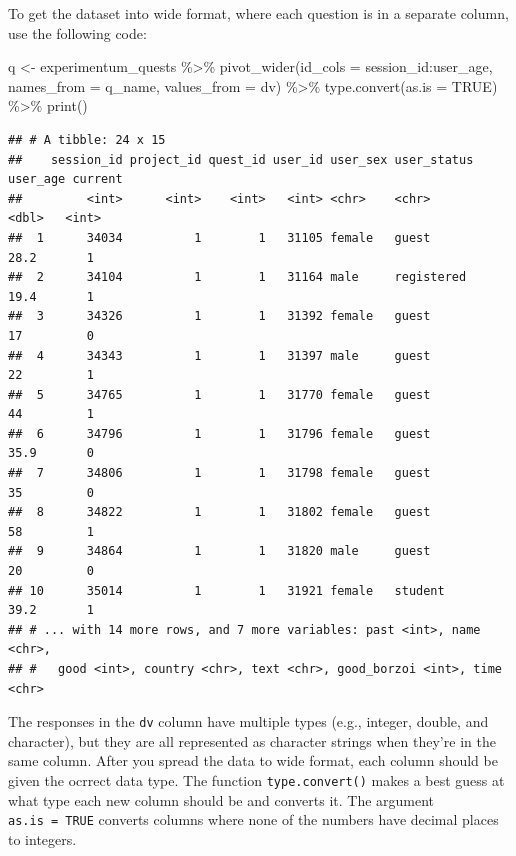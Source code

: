 \documentclass[
  oneside]{book}
\newenvironment{Shaded}{\begin{snugshade}}{\end{snugshade}}
\newcommand{\AttributeTok}[1]{\textcolor[rgb]{0.77,0.63,0.00}{#1}}
\newcommand{\ConstantTok}[1]{\textcolor[rgb]{0.00,0.00,0.00}{#1}}
\newcommand{\FunctionTok}[1]{\textcolor[rgb]{0.00,0.00,0.00}{#1}}
\newcommand{\NormalTok}[1]{#1}
\newcommand{\OtherTok}[1]{\textcolor[rgb]{0.56,0.35,0.01}{#1}}
\newcommand{\SpecialCharTok}[1]{\textcolor[rgb]{0.00,0.00,0.00}{#1}}
\begin{document}
To get the dataset into wide format, where each question is in a separate column, use the following code:

\begin{Shaded}
\begin{Highlighting}[]
\NormalTok{q }\OtherTok{\textless{}{-}}\NormalTok{ experimentum\_quests }\SpecialCharTok{\%\textgreater{}\%}
  \FunctionTok{pivot\_wider}\NormalTok{(}\AttributeTok{id\_cols =}\NormalTok{ session\_id}\SpecialCharTok{:}\NormalTok{user\_age,}
              \AttributeTok{names\_from =}\NormalTok{ q\_name,}
              \AttributeTok{values\_from =}\NormalTok{ dv) }\SpecialCharTok{\%\textgreater{}\%}
  \FunctionTok{type.convert}\NormalTok{(}\AttributeTok{as.is =} \ConstantTok{TRUE}\NormalTok{) }\SpecialCharTok{\%\textgreater{}\%}
  \FunctionTok{print}\NormalTok{()}
\end{Highlighting}
\end{Shaded}

\begin{verbatim}
## # A tibble: 24 x 15
##    session_id project_id quest_id user_id user_sex user_status user_age current
##         <int>      <int>    <int>   <int> <chr>    <chr>          <dbl>   <int>
##  1      34034          1        1   31105 female   guest           28.2       1
##  2      34104          1        1   31164 male     registered      19.4       1
##  3      34326          1        1   31392 female   guest           17         0
##  4      34343          1        1   31397 male     guest           22         1
##  5      34765          1        1   31770 female   guest           44         1
##  6      34796          1        1   31796 female   guest           35.9       0
##  7      34806          1        1   31798 female   guest           35         0
##  8      34822          1        1   31802 female   guest           58         1
##  9      34864          1        1   31820 male     guest           20         0
## 10      35014          1        1   31921 female   student         39.2       1
## # ... with 14 more rows, and 7 more variables: past <int>, name <chr>,
## #   good <int>, country <chr>, text <chr>, good_borzoi <int>, time <chr>
\end{verbatim}

\begin{info}
The responses in the \texttt{dv} column have multiple types (e.g., integer, double, and character), but they are all represented as character strings when they're in the same column. After you spread the data to wide format, each column should be given the ocrrect data type. The function \texttt{type.convert()} makes a best guess at what type each new column should be and converts it. The argument \texttt{as.is\ =\ TRUE} converts columns where none of the numbers have decimal places to integers.

\end{info}
\end{document}
